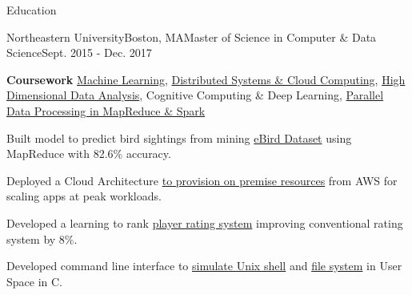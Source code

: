 \documentclass{resume} %
\begin{document}
\begin{rSection}{Education}

\begin{rSubsection}{Northeastern University}{Boston, MA}{Master of Science in Computer \& Data Science}{Sept. 2015 - Dec. 2017}
\item \textbf{Coursework} \href{http://www.ccs.neu.edu/home/vip/teach/MLcourse/html/}{Machine Learning}, \href{https://okrieg.github.io/EC500/index-spring-2016.html}{Distributed Systems \& Cloud Computing}, \href{http://www.ccs.neu.edu/home/eelhami/courses_nu_cs7180.htm}{High Dimensional Data Analysis}, Cognitive Computing \& Deep Learning, \href{http://www.ccs.neu.edu/home/mirek/classes/2012-F-CS6240/}{Parallel Data Processing in MapReduce \& Spark} \smallskip
\item Built model to predict bird sightings from mining \href{http://www.ccs.neu.edu/home/mirek/papers/ebird-ref-data.pdf}{eBird Dataset} using MapReduce with 82.6\% accuracy.
\item Deployed a Cloud Architecture \href{https://github.com/singhay/ms-courses-code/tree/master/CS7680-Cloud-Computing-Distributed-Systems}{to provision on premise resources} from AWS for scaling apps at peak workloads.
\item Developed a learning to rank \href{https://github.com/singhay/ms-courses-code/tree/master/CS6140-Machine-Learning}{player rating system} improving conventional rating system by 8\%.
\item Developed command line interface to \href{https://github.com/singhay/ms-courses-code/tree/master/CS5600-Computer-Systems/team-05-hw1-master}{simulate Unix shell} and \href{https://github.com/singhay/ms-courses-code/tree/master/CS5600-Computer-Systems/team-05-hw2-master}{file system} in User Space in C.
\end{rSubsection}


\end{rSection}
\end{document}

